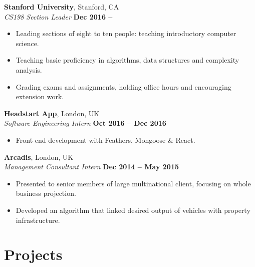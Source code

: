 \documentclass[margin,line]{resume}
\begin{document}
\begin{resume}
    \textbf{Stanford University}, Stanford, CA \vspace{2mm}\\\vspace{1mm}%
    \textsl{CS198 Section Leader} \hfill \textbf{Dec 2016 --}
    \begin{itemize}
	\setlength\itemsep{-0.05em}
 	    \item Leading sections of eight to ten people: teaching introductory computer science.
        \item Teaching basic proficiency in algorithms, data structures and complexity analysis.
	    \item Grading exams and assignments, holding office hours and encouraging extension work.
    \end{itemize}

    \textbf{Headstart App}, London, UK \vspace{2mm}\\\vspace{1mm}%
    \textsl{Software Engineering Intern} \hfill \textbf{Oct 2016 -- Dec 2016}
    \begin{itemize}
	\setlength\itemsep{-0.05em}
        \item Front-end development with Feathers, Mongoose \& React.
    \end{itemize}

    \textbf{Arcadis}, London, UK \vspace{2mm}\\\vspace{1mm}%
    \textsl{Management Consultant Intern} \hfill \textbf{Dec 2014 -- May 2015}
    \begin{itemize}
	\setlength\itemsep{-0.05em}
        \item Presented to senior members of large multinational client, focusing on whole business projection.
        \item Developed an algorithm that linked desired output of vehicles with property infrastructure.
    \end{itemize}

   \section{\mysidestyle Projects}
   

\end{resume}
\end{document}
